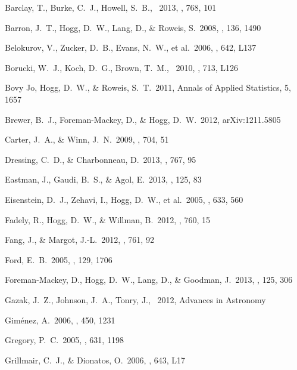 \documentclass[letterpaper,12pt,preprint]{hack_aastex}
\begin{document}
\clearpage
\begin{thebibliography}{}\raggedright%

Barclay, T., Burke, C.~J., Howell, S.~B., \etal\ 2013, \apj, {768}, 101

Barron, J.~T., Hogg, D.~W., Lang, D., \& Roweis, S.\ 2008, \aj, 136, 1490

Belokurov, V., Zucker, D.~B., Evans, N.~W., et al.\ 2006, \apjl, 642, L137

Borucki, W.~J., Koch, D.~G., Brown, T.~M., \etal\ 2010, \apjl, {713}, L126

Bovy Jo, Hogg, D.~W., \& Roweis, S.~T.\ 2011, Annals of Applied Statistics,
5, 1657

Brewer, B.~J., Foreman-Mackey, D., \& Hogg, D.~W.\ 2012, arXiv:1211.5805


Carter, J.~A., \& Winn, J.~N.\ 2009, \apj, 704, 51

Dressing, C.~D., \& Charbonneau, D.\ 2013, \apj, {767}, 95

Eastman, J., Gaudi, B.~S., \& Agol, E.\ 2013, \pasp, {125}, 83

Eisenstein, D.~J., Zehavi, I., Hogg, D.~W., et al.\ 2005, \apj, 633, 560

Fadely, R., Hogg, D.~W., \& Willman, B.\ 2012, \apj, 760, 15

Fang, J., \& Margot, J.-L.\ 2012, \apj, 761, 92

Ford, E.~B.\ 2005, \aj, {129}, 1706

Foreman-Mackey, D., Hogg, D.~W., Lang, D., \& Goodman, J.\ 2013,
\pasp, {125}, 306

Gazak, J.~Z., Johnson, J.~A., Tonry, J., \etal\ 2012, Advances in Astronomy

Gim{\'e}nez, A.\ 2006, \aap, {450}, 1231

Gregory, P.~C.\ 2005, \apj, 631, 1198

Grillmair, C.~J., \& Dionatos, O.\ 2006, \apjl, 643, L17


\end{thebibliography}
\end{document}
